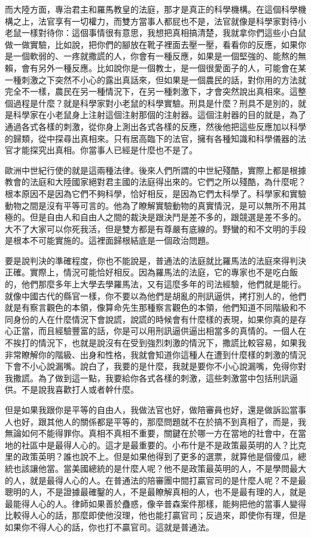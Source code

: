 而大陸方面，專治君主和羅馬教皇的法庭，那才是真正的科學機構。在這個科學機構之上，法官享有一切權力，而雙方當事人都屁也不是，法官就像是科學家對待小老鼠一樣對待你：這個事情很有意思，我想把真相搞清楚，我就拿你們這些小白鼠做一做實驗，比如說，把你們的腳放在靴子裡面去壓一壓，看看你的反應，如果你是一個軟弱的、一疼就撒謊的人，你會有一種反應，如果是一個堅強的、能熬的無賴，會有另外一種反應。比如說你是一個教士，是一個很愛面子的人，可能會在某一種刺激之下突然不小心的露出真話來，但如果是一個農民的話，對你用的方法就完全不一樣，農民在另一種情況下，在另一種刺激下，才會突然說出真相來。這整個過程是什麼？就是科學家對小老鼠的科學實驗。刑具是什麼？刑具不是別的，就是科學家在小老鼠身上注射這個注射那個的注射器。這個注射器的目的就是，為了通過各式各樣的刺激，從你身上測出各式各樣的反應，然後他把這些反應加以科學的歸類，從中探尋出真相來。只有居高臨下的法官，擁有各種知識和科學儀器的法官才能探究出真相。你當事人已經是什麼也不是了。

歐洲中世紀行使的就是這兩種法律。後來人們所謂的中世紀殘酷，實際上都是根據教會的法庭和大陸國家絕對君主國的法庭得出來的。它們之所以殘酷，為什麼呢？根本原因不是因為它們不夠科學，恰好相反，是因為它們太科學了。科學家和實驗動物之間是沒有平等可言的。他為了瞭解實驗動物的真實情況，是可以無所不用其極的。但是自由人和自由人之間的裁決是跟決鬥是差不多的，跟競選是差不多的。大不了大家可以你死我活，但是雙方都是有尊嚴有底線的。野蠻的和不文明的手段是根本不可能實施的。這裡面歸根結底是一個政治問題。

要是說判決的準確程度，你也不能說是，普通法的法庭就比羅馬法的法庭來得判決正確。實際上，情況可能恰好相反。因為羅馬法的法庭，它的專家也不是吃白飯的，他們那麼多年上大學去學羅馬法，又有這麼多年的司法經驗，他們就是能行。就像中國古代的縣官一樣，你不要以為他們是胡亂的刑訊逼供，拷打別人的，他們就是有察言觀色的本領，像算命先生那種察言觀色的本領，他們知道不同階級和不同身份的人在什麼情況下會說謊，說謊的時候會有什麼樣的表現，如果你真的是存心正當，而且經驗豐富的話，你是可以用刑訊逼供逼出相當多的真情的。一個人在不挨打的情況下，也就是說沒有在受到強烈刺激的情況下，撒謊比較容易，如果我非常瞭解你的階級、出身和性格，我就會知道你這種人在遭到什麼樣的刺激的情況下會不小心說漏嘴。說白了，我要的是什麼，我就是要你不小心說漏嘴，免得你對我撒謊。為了做到這一點，我要給你各式各樣的刺激，這些刺激當中包括刑訊逼供。不是說我喜歡打人或者幹什麼。

但是如果我跟你是平等的自由人，我做法官也好，做陪審員也好，還是做訴訟當事人也好，跟其他人的關係都是平等的，那麼問題就不在於搞不到真相了，而是，我無論如何不能得罪你。真相不真相不重要，關鍵在於哪一方在當地的社會中，在當地的社區中是最得人心的。這才是最重要的。小布什是不是政策最英明的人？比克里的政策英明？誰也說不上。但是如果他得到了更多的選票，就算他是個傻瓜，總統也該讓他當。當美國總統的是什麼人呢？他不是政策最英明的人，不是學問最大的人，就是最得人心的人。在普通法的陪審團中間打贏官司的是什麼人呢？不是最聰明的人，不是證據最確鑿的人，不是最瞭解真相的人，也不是最有理的人，就是最能得人心的人。律師如果善於蠱惑，像辛普森案件那樣，能夠把他的當事人變得比較得人心的話，那麼即使他沒理，他也能打贏官司；反過來，即使你有理，但是如果你不得人心的話，你也打不贏官司。這就是普通法。

